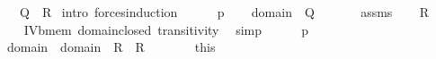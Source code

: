 \begin{isabellebody}
\ \ \ \ {\isacharparenleft}{\kern0pt}\ {\isachardoublequoteopen}{\isacharquery}{\kern0pt}Q{\isacharparenleft}{\kern0pt}{\isasymtau}{\isacharcomma}{\kern0pt}{\isasymtheta}{\isacharparenright}{\kern0pt}\ {\isasymand}\ {\isacharquery}{\kern0pt}R{\isacharparenleft}{\kern0pt}{\isasymtau}{\isacharcomma}{\kern0pt}{\isasymtheta}{\isacharparenright}{\kern0pt}{\isachardoublequoteclose}{\isacharparenright}{\kern0pt}\isanewline
%
\isadelimproof
%
\endisadelimproof
%
\isatagproof
{}\isamarkupfalse%
\ {\isacharparenleft}{\kern0pt}intro\ forces{\isacharunderscore}{\kern0pt}induction{\isacharparenright}{\kern0pt}\isanewline
\ \ \isamarkupfalse%
\ {\isasymtau}\ {\isasymtheta}\ p\isanewline
\ \ \isamarkupfalse%
\ {\isachardoublequoteopen}{\isasymsigma}{\isasymin}domain{\isacharparenleft}{\kern0pt}{\isasymtheta}{\isacharparenright}{\kern0pt}\ {\isasymLongrightarrow}\ {\isacharquery}{\kern0pt}Q{\isacharparenleft}{\kern0pt}{\isasymtau}{\isacharcomma}{\kern0pt}\ {\isasymsigma}{\isacharparenright}{\kern0pt}{\isachardoublequoteclose}\ \ {\isasymsigma}\isanewline
\ \ \isamarkupfalse%
\ assms\isanewline
\ \ \isamarkupfalse%
\ {\isachardoublequoteopen}{\isacharquery}{\kern0pt}R{\isacharparenleft}{\kern0pt}{\isasymtau}{\isacharcomma}{\kern0pt}\ {\isasymtheta}{\isacharparenright}{\kern0pt}{\isachardoublequoteclose}\isanewline
\ \ \ \ \isamarkupfalse%
\ IV{}{}{}b{\isacharunderscore}{\kern0pt}mem\ domain{\isacharunderscore}{\kern0pt}closed\ transitivity\ \isamarkupfalse%
\ {\isacharparenleft}{\kern0pt}simp{\isacharparenright}{\kern0pt}\isanewline
{}\isamarkupfalse%
\isanewline
\ \ \isamarkupfalse%
\ {\isasymtau}\ {\isasymtheta}\ p\isanewline
\ \ \isamarkupfalse%
\ {\isachardoublequoteopen}{\isasymsigma}\ {\isasymin}\ domain{\isacharparenleft}{\kern0pt}{\isasymtau}{\isacharparenright}{\kern0pt}\ {\isasymunion}\ domain{\isacharparenleft}{\kern0pt}{\isasymtheta}{\isacharparenright}{\kern0pt}\ {\isasymLongrightarrow}\ {\isacharquery}{\kern0pt}R{\isacharparenleft}{\kern0pt}{\isasymsigma}{\isacharcomma}{\kern0pt}{\isasymtau}{\isacharparenright}{\kern0pt}\ {\isasymand}\ {\isacharquery}{\kern0pt}R{\isacharparenleft}{\kern0pt}{\isasymsigma}{\isacharcomma}{\kern0pt}{\isasymtheta}{\isacharparenright}{\kern0pt}{\isachardoublequoteclose}\ \ {\isasymsigma}\isanewline
\ \ \isamarkupfalse%
\ \isamarkupfalse%
\ this\isanewline

\end{isabellebody}
